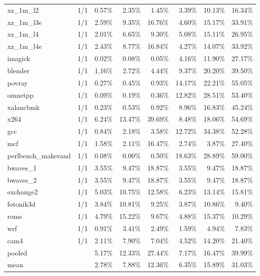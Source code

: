 \documentclass[10pt,a4paper,landscape]{article}
\begin{document}
{\begin{longtable}{lcrrrrrr}
xz\_1m\_l2 & 1/1 & 0.57\% & 2.35\% & 1.45\% & 3.39\% & 10.13\% & 16.34\% \\
xz\_1m\_l3e & 1/1 & 2.59\% & 9.35\% & 16.76\% & 4.60\% & 15.17\% & 33.91\% \\
xz\_1m\_l4 & 1/1 & 2.01\% & 6.65\% & 9.30\% & 5.08\% & 15.11\% & 26.95\% \\
xz\_1m\_l4e & 1/1 & 2.43\% & 8.77\% & 16.84\% & 4.27\% & 14.07\% & 33.92\% \\
imagick & 1/1 & 0.02\% & 0.08\% & 0.05\% & 4.16\% & 11.90\% & 27.17\% \\
blender & 1/1 & 1.16\% & 2.72\% & 4.44\% & 9.37\% & 20.20\% & 39.50\% \\
povray & 1/1 & 0.27\% & 0.45\% & 0.93\% & 14.17\% & 22.21\% & 55.05\% \\
omnetpp & 1/1 & 0.09\% & 0.19\% & 0.36\% & 12.82\% & 28.51\% & 53.40\% \\
xalancbmk & 1/1 & 0.23\% & 0.53\% & 0.92\% & 8.96\% & 16.83\% & 45.24\% \\
x264 & 1/1 & 6.24\% & 13.47\% & 39.69\% & 8.48\% & 18.06\% & 54.69\% \\
gcc & 1/1 & 0.84\% & 2.18\% & 3.58\% & 12.72\% & 34.38\% & 52.28\% \\
mcf & 1/1 & 1.58\% & 2.11\% & 16.47\% & 2.74\% & 3.87\% & 27.40\% \\
perlbench\_makerand & 1/1 & 0.08\% & 0.00\% & 0.50\% & 18.63\% & 28.89\% & 59.00\% \\
bwaves\_1 & 1/1 & 3.55\% & 9.47\% & 18.87\% & 3.55\% & 9.47\% & 18.87\% \\
bwaves\_2 & 1/1 & 3.55\% & 9.47\% & 18.87\% & 3.55\% & 9.47\% & 18.87\% \\
exchange2 & 1/1 & 5.03\% & 10.75\% & 12.58\% & 6.23\% & 13.14\% & 15.81\% \\
fotonik3d & 1/1 & 3.84\% & 10.81\% & 9.25\% & 3.87\% & 10.86\% & 9.40\% \\
roms & 1/1 & 4.79\% & 15.22\% & 9.67\% & 4.88\% & 15.37\% & 10.29\% \\
wrf & 1/1 & 0.91\% & 3.41\% & 2.49\% & 1.59\% & 4.94\% & 7.83\% \\
cam4 & 1/1 & 2.11\% & 7.90\% & 7.04\% & 4.52\% & 14.20\% & 21.40\% \\
\midrule
pooled &  & 5.17\% & 12.33\% & 27.44\% & 7.17\% & 16.47\% & 39.99\% \\
mean &  & 2.78\% & 7.88\% & 12.36\% & 6.35\% & 15.89\% & 31.03\% \\
\end{longtable}
}
\end{document}
